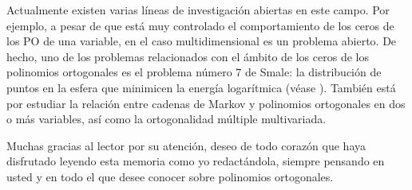 Actualmente existen varias líneas de investigación abiertas en este campo. Por ejemplo, a pesar de que está muy controlado el comportamiento de los ceros de los PO de una variable, en el caso multidimensional es un problema abierto. De hecho, uno de los problemas relacionados con el ámbito de los ceros de los polinomios ortogonales es el problema número 7 de Smale: la distribución de puntos en la esfera que minimicen la energía logarítmica (véase \cite{Beltran}). También está por estudiar la relación entre cadenas de Markov y polinomios ortogonales en dos o más variables, así como la ortogonalidad múltiple multivariada.

Muchas gracias al lector por su atención, deseo de todo corazón que haya disfrutado leyendo esta memoria como yo redactándola, siempre pensando en usted y en todo el que desee conocer sobre polinomios ortogonales.
